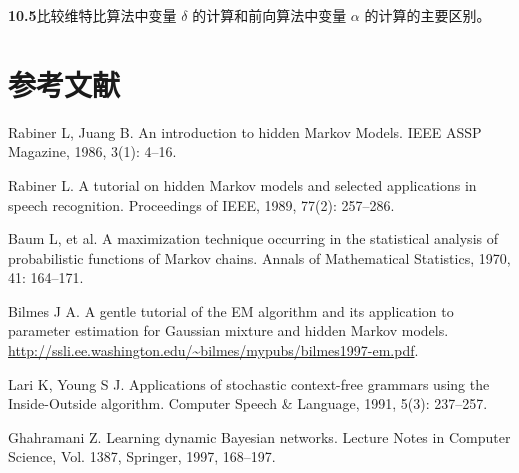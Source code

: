 \documentclass[UTF8, 12pt, fontset=fandol, oneside]{ctexart}
\begin{document}
\noindent\textbf{10.5}\quad 比较维特比算法中变量 $\delta$ 的计算和前向算法中变量 $\alpha$ 的计算的主要区别。

\section*{参考文献}

\noindent [1] Rabiner L, Juang B. An introduction to hidden Markov Models. IEEE ASSP Magazine, 1986, 3(1): 4--16.

\noindent [2] Rabiner L. A tutorial on hidden Markov models and selected applications in speech recognition. Proceedings of IEEE, 1989, 77(2): 257--286.

\noindent [3] Baum L, et al. A maximization technique occurring in the statistical analysis of probabilistic functions of Markov chains. Annals of Mathematical Statistics, 1970, 41: 164--171.

\noindent [4] Bilmes J A. A gentle tutorial of the EM algorithm and its application to parameter estimation for Gaussian mixture and hidden Markov models. \url{http://ssli.ee.washington.edu/~bilmes/mypubs/bilmes1997-em.pdf}.

\noindent [5] Lari K, Young S J. Applications of stochastic context-free grammars using the Inside-Outside algorithm. Computer Speech \& Language, 1991, 5(3): 237--257.

\noindent [6] Ghahramani Z. Learning dynamic Bayesian networks. Lecture Notes in Computer Science, Vol. 1387, Springer, 1997, 168--197.
\end{document}
